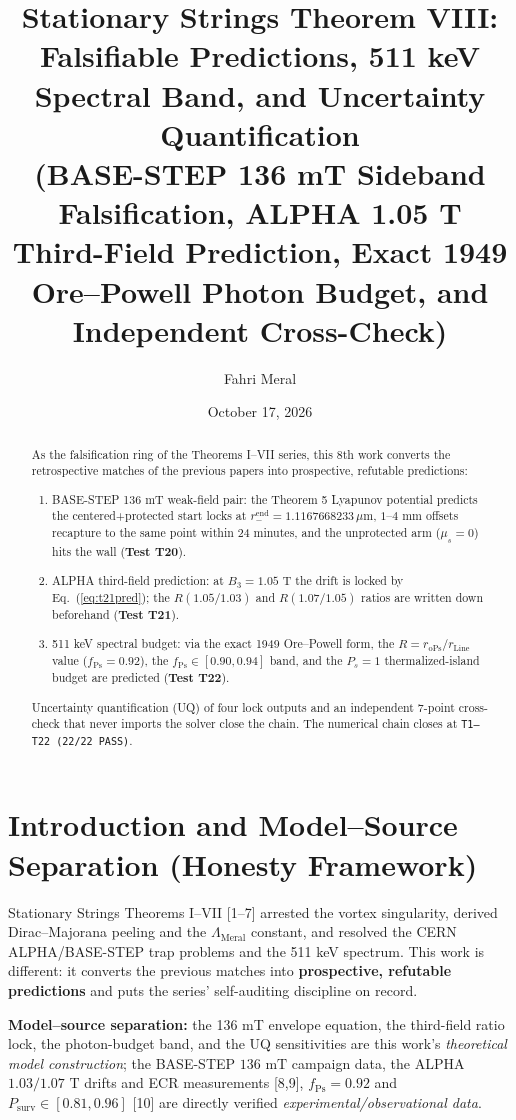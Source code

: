 \documentclass[12pt,a4paper]{article}
\title{\textbf{Stationary Strings Theorem VIII: Falsifiable Predictions, 511 keV Spectral Band, and Uncertainty Quantification} \\[0.3cm]
\large (BASE-STEP 136 mT Sideband Falsification, ALPHA 1.05 T Third-Field Prediction, Exact 1949 Ore--Powell Photon Budget, and Independent Cross-Check)}
\author{Fahri Meral}
\date{October 17, 2026}
\begin{document}
\maketitle

\begin{abstract}
As the falsification ring of the Theorems I--VII series, this 8th work converts the retrospective matches of the previous papers into prospective, refutable predictions:
\begin{enumerate}
    \item BASE-STEP 136 mT weak-field pair: the Theorem 5 Lyapunov potential predicts the centered+protected start locks at $r_-^{\mathrm{end}} = 1.1167668233\,\mu\text{m}$, $1$--$4\text{ mm}$ offsets recapture to the same point within 24 minutes, and the unprotected arm ($\mu_s=0$) hits the wall (\textbf{Test T20}).
    \item ALPHA third-field prediction: at $B_3=1.05\text{ T}$ the drift is locked by Eq.\ (\ref{eq:t21pred}); the $R(1.05/1.03)$ and $R(1.07/1.05)$ ratios are written down beforehand (\textbf{Test T21}).
    \item 511 keV spectral budget: via the exact 1949 Ore--Powell form, the $R = r_{\mathrm{oPs}}/r_{\mathrm{Line}}$ value ($f_{\mathrm{Ps}}=0.92$), the $f_{\mathrm{Ps}}\in[0.90,0.94]$ band, and the $P_s=1$ thermalized-island budget are predicted (\textbf{Test T22}).
\end{enumerate}
Uncertainty quantification (UQ) of four lock outputs and an independent 7-point cross-check that never imports the solver close the chain. The numerical chain closes at \texttt{T1--T22 (22/22 PASS)}.
\end{abstract}

\section{Introduction and Model--Source Separation (Honesty Framework)}

Stationary Strings Theorems I--VII [1--7] arrested the vortex singularity, derived Dirac--Majorana peeling and the $\Lambda_{\mathrm{Meral}}$ constant, and resolved the CERN ALPHA/BASE-STEP trap problems and the 511 keV spectrum. This work is different: it converts the previous matches into \textbf{prospective, refutable predictions} and puts the series' self-auditing discipline on record.

\textbf{Model--source separation:} the 136 mT envelope equation, the third-field ratio lock, the photon-budget band, and the UQ sensitivities are this work's \textit{theoretical model construction}; the BASE-STEP $136\text{ mT}$ campaign data, the ALPHA $1.03/1.07\text{ T}$ drifts and ECR measurements [8,9], $f_{\mathrm{Ps}}=0.92$ and $P_{\mathrm{surv}}\in[0.81,0.96]$ [10] are directly verified \textit{experimental/observational data}.
\end{document}
